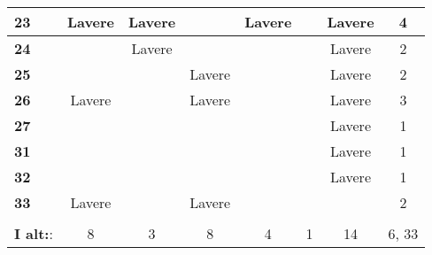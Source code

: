 \begin{longtable}{l|c|c|c|c|c|c|c}
\cellcolor[HTML]{C0C0C0}\textbf{23} & Lavere & Lavere & & Lavere & & Lavere  & \cellcolor[HTML]{EFEFEF} 4\\ \hline
\cellcolor[HTML]{C0C0C0}\textbf{24} & & Lavere & & & & Lavere & \cellcolor[HTML]{EFEFEF} 2 \\\hline
\cellcolor[HTML]{C0C0C0}\textbf{25} & & & Lavere & & & Lavere & \cellcolor[HTML]{EFEFEF} 2 \\\hline
\cellcolor[HTML]{C0C0C0}\textbf{26} & Lavere & & Lavere & & & Lavere  & \cellcolor[HTML]{EFEFEF} 3\\\hline
\cellcolor[HTML]{C0C0C0}\textbf{27} & & &  &  & & Lavere  & \cellcolor[HTML]{EFEFEF} 1\\\hline
\cellcolor[HTML]{C0C0C0}\textbf{31} & & &  &  & & Lavere & \cellcolor[HTML]{EFEFEF} 1 \\\hline
\cellcolor[HTML]{C0C0C0}\textbf{32} & & & & & & Lavere & \cellcolor[HTML]{EFEFEF}1 \\\hline
\cellcolor[HTML]{C0C0C0}\textbf{33} & Lavere & & Lavere & & & & \cellcolor[HTML]{EFEFEF} 2\\\hline
\rowcolor[HTML]{EFEFEF}\multicolumn{8}{r}{\textbf{Gennemsnit}}\\
\rowcolor[HTML]{EFEFEF} \textbf{I alt:}: & 8 & 3 & 8 & 4 & 1 & 14  & 6, 33\\
\end{longtable}



